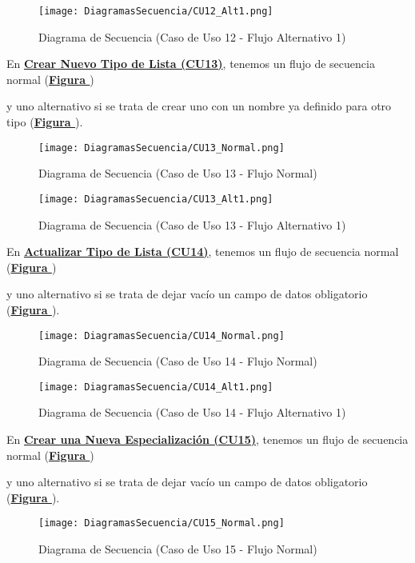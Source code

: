 \begin{figure}[!htbp]
  \centering
  \texttt{[image: DiagramasSecuencia/CU12\_Alt1.png]}
  \caption{Diagrama de Secuencia (Caso de Uso 12 - Flujo Alternativo 1)}
  \label{fig:Secuencia_CU12_Alt1}
\end{figure}
\FloatBarrier

\addtocounter{figura}{1}
En \textbf{\hyperref[tab:curCrearTipoLst]{Crear Nuevo Tipo de Lista (CU13)}}, tenemos un flujo de secuencia normal (\textbf{\hyperref[fig:Secuencia_CU13_Normal]{Figura }}) \addtocounter{figura}{1} y uno alternativo si se trata de crear uno con un nombre ya definido para otro tipo (\textbf{\hyperref[fig:Secuencia_CU13_Alt1]{Figura }}).
\begin{figure}[!htbp]
  \centering
  \texttt{[image: DiagramasSecuencia/CU13\_Normal.png]}
  \caption{Diagrama de Secuencia (Caso de Uso 13 - Flujo Normal)}
  \label{fig:Secuencia_CU13_Normal}
\end{figure}
\FloatBarrier

\begin{figure}[!htbp]
  \centering
  \texttt{[image: DiagramasSecuencia/CU13\_Alt1.png]}
  \caption{Diagrama de Secuencia (Caso de Uso 13 - Flujo Alternativo 1)}
  \label{fig:Secuencia_CU13_Alt1}
\end{figure}
\FloatBarrier

\addtocounter{figura}{1}
En \textbf{\hyperref[tab:curActualizarTipoLst]{Actualizar Tipo de Lista (CU14)}}, tenemos un flujo de secuencia normal (\textbf{\hyperref[fig:Secuencia_CU14_Normal]{Figura }}) \addtocounter{figura}{1} y uno alternativo si se trata de dejar vacío un campo de datos obligatorio (\textbf{\hyperref[fig:Secuencia_CU14_Alt1]{Figura }}).
\begin{figure}[!htbp]
  \centering
  \texttt{[image: DiagramasSecuencia/CU14\_Normal.png]}
  \caption{Diagrama de Secuencia (Caso de Uso 14 - Flujo Normal)}
  \label{fig:Secuencia_CU14_Normal}
\end{figure}
\FloatBarrier

\begin{figure}[!htbp]
  \centering
  \texttt{[image: DiagramasSecuencia/CU14\_Alt1.png]}
  \caption{Diagrama de Secuencia (Caso de Uso 14 - Flujo Alternativo 1)}
  \label{fig:Secuencia_CU14_Alt1}
\end{figure}
\FloatBarrier

\addtocounter{figura}{1}
En \textbf{\hyperref[tab:curCrearEspec]{Crear una Nueva Especialización (CU15)}}, tenemos un flujo de secuencia normal (\textbf{\hyperref[fig:Secuencia_CU15_Normal]{Figura }}) \addtocounter{figura}{1} y uno alternativo si se trata de dejar vacío un campo de datos obligatorio (\textbf{\hyperref[fig:Secuencia_CU15_Alt1]{Figura }}).
\begin{figure}[!htbp]
  \centering
  \texttt{[image: DiagramasSecuencia/CU15\_Normal.png]}
  \caption{Diagrama de Secuencia (Caso de Uso 15 - Flujo Normal)}
  \label{fig:Secuencia_CU15_Normal}
\end{figure}
\FloatBarrier

